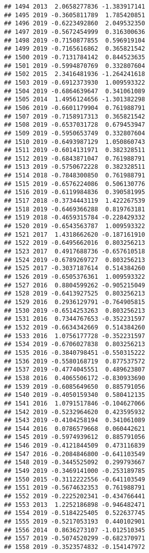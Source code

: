 \documentclass[
]{article}
\begin{document}
\begin{verbatim}
## 1494 2013  2.0658277836 -1.383917141
## 1495 2019 -0.3605811789  1.785420851
## 1496 2019 -0.6223492860  2.049532350
## 1497 2019 -0.5672454999  0.316300636
## 1498 2019 -0.7150877855  0.596919104
## 1499 2019 -0.7165616862  0.365821542
## 1500 2019 -0.7131784142  0.844523635
## 1501 2019 -0.5994870769  0.332807604
## 1502 2015  2.3416481936 -1.264241618
## 1503 2019 -0.6912373930  1.009593322
## 1504 2019 -0.6864639647  0.341061089
## 1505 2014  1.4956124656 -1.301382298
## 1506 2019 -0.6601179904  0.761988791
## 1507 2019 -0.7158917313  0.365821542
## 1508 2019 -0.6537031728  0.679453947
## 1509 2019 -0.5950653749  0.332807604
## 1510 2019 -0.6493987129  1.050860743
## 1511 2019 -0.6014131971  0.382328511
## 1512 2019 -0.6843871047  0.761988791
## 1513 2019 -0.5750672228  0.382328511
## 1514 2018 -0.7848300850  0.761988791
## 1515 2019 -0.6576224086  0.506130776
## 1516 2019 -0.6119984836  0.390581995
## 1517 2018 -0.3734443119  1.422267539
## 1518 2019 -0.6469366288  0.819763181
## 1519 2018 -0.4659315784 -0.228429332
## 1520 2019 -0.6543563787  1.009593322
## 1521 2017  1.4318662620 -0.187161910
## 1522 2019 -0.6495662016  0.803256213
## 1523 2017  0.4917688736 -0.657610518
## 1524 2019 -0.6789269727  0.803256213
## 1525 2017 -0.3037187614  0.514384260
## 1526 2019 -0.6505376361  1.009593322
## 1527 2016  0.8804599262 -0.905215049
## 1528 2019 -0.6413927525  0.803256213
## 1529 2016  0.2936129791 -0.764905815
## 1530 2019 -0.6514253263  0.803256213
## 1531 2016  0.7344767653 -0.352231597
## 1532 2019 -0.6634342669  0.514384260
## 1533 2016  1.0756177728 -0.352231597
## 1534 2019 -0.6706027838  0.803256213
## 1535 2016 -0.3840798451 -0.550315222
## 1536 2019 -0.5580168719  0.877537572
## 1537 2019 -0.4774045551  0.489623807
## 1538 2016  0.4065506172 -0.830933690
## 1539 2019 -0.6085649650  0.885791056
## 1540 2019 -0.4050159340  0.580412135
## 1541 2016  1.0791517846 -0.104627066
## 1542 2019 -0.5232964620  0.423595932
## 1543 2019 -0.4104258194  0.341061089
## 1544 2016  0.0786579668  0.060442621
## 1545 2019 -0.5974939612  0.885791056
## 1546 2019 -0.4121844509  0.473116839
## 1547 2016 -0.2084846800 -0.641103549
## 1548 2019 -0.3445525092  0.299793667
## 1549 2019 -0.3469141000 -0.253189785
## 1550 2015 -0.3112222556 -0.641103549
## 1551 2019 -0.5674632353  0.761988791
## 1552 2019 -0.2225202341 -0.434766441
## 1553 2013  1.2252186898 -0.946482471
## 1554 2019 -0.5184225405  0.522637745
## 1555 2019 -0.5217053193  0.440102901
## 1556 2014  0.8636273107 -1.012510345
## 1557 2019 -0.5074520299 -0.682370971
## 1558 2019 -0.3523574832 -0.154147972

\end{verbatim}
\end{document}
